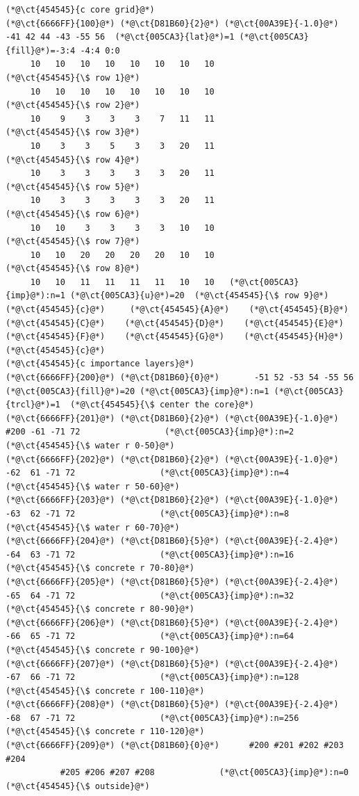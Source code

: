 \begin{lstlisting}[firstnumber=last]
(*@\ct{454545}{c core grid}@*)
(*@\ct{6666FF}{100}@*) (*@\ct{D81B60}{2}@*) (*@\ct{00A39E}{-1.0}@*) -41 42 44 -43 -55 56  (*@\ct{005CA3}{lat}@*)=1 (*@\ct{005CA3}{fill}@*)=-3:4 -4:4 0:0
     10   10   10   10   10   10   10   10                 (*@\ct{454545}{\$ row 1}@*)
     10   10   10   10   10   10   10   10                 (*@\ct{454545}{\$ row 2}@*)
     10    9    3    3    3    7   11   11                 (*@\ct{454545}{\$ row 3}@*)
     10    3    3    5    3    3   20   11                 (*@\ct{454545}{\$ row 4}@*)
     10    3    3    3    3    3   20   11                 (*@\ct{454545}{\$ row 5}@*)
     10    3    3    3    3    3   20   11                 (*@\ct{454545}{\$ row 6}@*)
     10   10    3    3    3    3   10   10                 (*@\ct{454545}{\$ row 7}@*)
     10   10   20   20   20   20   10   10                 (*@\ct{454545}{\$ row 8}@*)
     10   10   11   11   11   11   10   10   (*@\ct{005CA3}{imp}@*):n=1 (*@\ct{005CA3}{u}@*)=20  (*@\ct{454545}{\$ row 9}@*)
(*@\ct{454545}{c}@*)     (*@\ct{454545}{A}@*)    (*@\ct{454545}{B}@*)    (*@\ct{454545}{C}@*)    (*@\ct{454545}{D}@*)    (*@\ct{454545}{E}@*)    (*@\ct{454545}{F}@*)    (*@\ct{454545}{G}@*)    (*@\ct{454545}{H}@*)
(*@\ct{454545}{c}@*)
(*@\ct{454545}{c importance layers}@*)
(*@\ct{6666FF}{200}@*) (*@\ct{D81B60}{0}@*)       -51 52 -53 54 -55 56   (*@\ct{005CA3}{fill}@*)=20 (*@\ct{005CA3}{imp}@*):n=1 (*@\ct{005CA3}{trcl}@*)=1  (*@\ct{454545}{\$ center the core}@*)
(*@\ct{6666FF}{201}@*) (*@\ct{D81B60}{2}@*) (*@\ct{00A39E}{-1.0}@*) #200 -61 -71 72                 (*@\ct{005CA3}{imp}@*):n=2         (*@\ct{454545}{\$ water r 0-50}@*)
(*@\ct{6666FF}{202}@*) (*@\ct{D81B60}{2}@*) (*@\ct{00A39E}{-1.0}@*)  -62  61 -71 72                 (*@\ct{005CA3}{imp}@*):n=4         (*@\ct{454545}{\$ water r 50-60}@*)
(*@\ct{6666FF}{203}@*) (*@\ct{D81B60}{2}@*) (*@\ct{00A39E}{-1.0}@*)  -63  62 -71 72                 (*@\ct{005CA3}{imp}@*):n=8         (*@\ct{454545}{\$ water r 60-70}@*)
(*@\ct{6666FF}{204}@*) (*@\ct{D81B60}{5}@*) (*@\ct{00A39E}{-2.4}@*)  -64  63 -71 72                 (*@\ct{005CA3}{imp}@*):n=16        (*@\ct{454545}{\$ concrete r 70-80}@*)
(*@\ct{6666FF}{205}@*) (*@\ct{D81B60}{5}@*) (*@\ct{00A39E}{-2.4}@*)  -65  64 -71 72                 (*@\ct{005CA3}{imp}@*):n=32        (*@\ct{454545}{\$ concrete r 80-90}@*)
(*@\ct{6666FF}{206}@*) (*@\ct{D81B60}{5}@*) (*@\ct{00A39E}{-2.4}@*)  -66  65 -71 72                 (*@\ct{005CA3}{imp}@*):n=64        (*@\ct{454545}{\$ concrete r 90-100}@*)
(*@\ct{6666FF}{207}@*) (*@\ct{D81B60}{5}@*) (*@\ct{00A39E}{-2.4}@*)  -67  66 -71 72                 (*@\ct{005CA3}{imp}@*):n=128       (*@\ct{454545}{\$ concrete r 100-110}@*)
(*@\ct{6666FF}{208}@*) (*@\ct{D81B60}{5}@*) (*@\ct{00A39E}{-2.4}@*)  -68  67 -71 72                 (*@\ct{005CA3}{imp}@*):n=256       (*@\ct{454545}{\$ concrete r 110-120}@*)
(*@\ct{6666FF}{209}@*) (*@\ct{D81B60}{0}@*)      #200 #201 #202 #203 #204
           #205 #206 #207 #208             (*@\ct{005CA3}{imp}@*):n=0         (*@\ct{454545}{\$ outside}@*)


\end{lstlisting}
